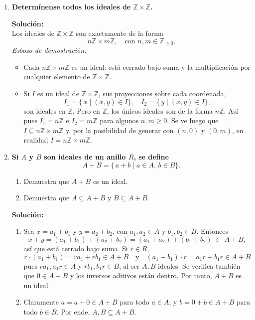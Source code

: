 \documentclass[12pt]{article}
\theoremstyle{definition}
\theoremstyle{remark}
\newcommand{\Z}{\mathbb{Z}}
\begin{document}
\begin{enumerate}[label=\textbf{\arabic*.}]
\item \textbf{Determínense todos los ideales de $\mathbb{Z} \times \mathbb{Z}$.}

\textbf{Solución:}\\
Los ideales de \(\mathbb{Z} \times \mathbb{Z}\) son exactamente de la forma 
\[
n\mathbb{Z} \times m\mathbb{Z}, 
\quad \text{con } n, m \in \mathbb{Z}_{\geq 0}.
\]
\textit{Esbozo de demostración:} 
\begin{itemize}
\item Cada $n\Z \times m\Z$ es un ideal: está cerrado bajo suma y la multiplicación por cualquier elemento de $\Z \times \Z$. 
\item Si $I$ es un ideal de $\Z \times \Z$, sus proyecciones sobre cada coordenada, 
\[
I_1 = \{\,x \mid (x,y)\in I\},\quad 
I_2 = \{\,y \mid (x,y)\in I\},
\]
son ideales en $\Z$. Pero en $\Z$, los únicos ideales son de la forma $n\Z$. Así pues $I_1 = n\Z$ e $I_2 = m\Z$ para algunos $n,m\ge 0$. Se ve luego que $I\subseteq n\Z \times m\Z$ y, por la posibilidad de generar con $(n,0)$ y $(0,m)$, en realidad $I = n\Z \times m\Z$.
\end{itemize}


\item \textbf{Si $A$ y $B$ son ideales de un anillo $R$, se define } 
\[
A + B = \{\,a + b \mid a \in A,\, b \in B\}.
\]
\begin{enumerate}
\item Demuestra que $A + B$ es un ideal.
\item Demuestra que $A \subseteq A + B$ y $B \subseteq A + B$.
\end{enumerate}

\textbf{Solución:}\\
\begin{enumerate}[label=(\alph*)]
\item Sea $x = a_1 + b_1$ y $y = a_2 + b_2$, con $a_1,a_2\in A$ y $b_1,b_2\in B$. Entonces
\[
x + y = (a_1 + b_1) + (a_2 + b_2) = (a_1 + a_2) + (b_1 + b_2) \;\in\; A + B,
\]
así que está cerrado bajo suma. Si $r\in R$, 
\[
r\cdot(a_1 + b_1) = ra_1 + rb_1 \in A+B
\quad\text{y}\quad
(a_1 + b_1)\cdot r = a_1r + b_1r \in A+B
\]
pues $ra_1,a_1r\in A$ y $rb_1,b_1r \in B$, al ser $A,B$ ideales. Se verifica también que $0 \in A+B$ y los inversos aditivos están dentro. Por tanto, $A+B$ es un ideal.

\item Claramente $a = a+0 \in A+B$ para todo $a\in A$, y $b=0+b \in A+B$ para todo $b\in B$. Por ende, $A,B \subseteq A+B$.
\end{enumerate}



\end{enumerate}
\end{document}
